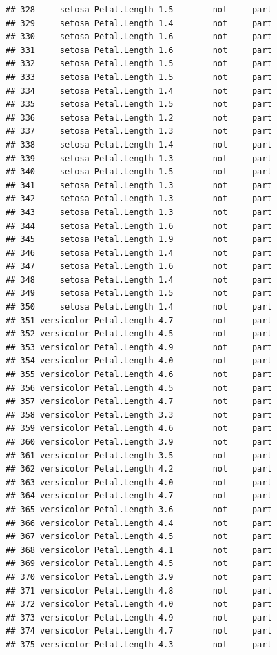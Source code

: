 \documentclass[krantz2]{krantz}\usepackage{knitr}%
\begin{document}
\begin{knitrout}
\begin{kframe}
\begin{verbatim}
## 328     setosa Petal.Length 1.5        not     part
## 329     setosa Petal.Length 1.4        not     part
## 330     setosa Petal.Length 1.6        not     part
## 331     setosa Petal.Length 1.6        not     part
## 332     setosa Petal.Length 1.5        not     part
## 333     setosa Petal.Length 1.5        not     part
## 334     setosa Petal.Length 1.4        not     part
## 335     setosa Petal.Length 1.5        not     part
## 336     setosa Petal.Length 1.2        not     part
## 337     setosa Petal.Length 1.3        not     part
## 338     setosa Petal.Length 1.4        not     part
## 339     setosa Petal.Length 1.3        not     part
## 340     setosa Petal.Length 1.5        not     part
## 341     setosa Petal.Length 1.3        not     part
## 342     setosa Petal.Length 1.3        not     part
## 343     setosa Petal.Length 1.3        not     part
## 344     setosa Petal.Length 1.6        not     part
## 345     setosa Petal.Length 1.9        not     part
## 346     setosa Petal.Length 1.4        not     part
## 347     setosa Petal.Length 1.6        not     part
## 348     setosa Petal.Length 1.4        not     part
## 349     setosa Petal.Length 1.5        not     part
## 350     setosa Petal.Length 1.4        not     part
## 351 versicolor Petal.Length 4.7        not     part
## 352 versicolor Petal.Length 4.5        not     part
## 353 versicolor Petal.Length 4.9        not     part
## 354 versicolor Petal.Length 4.0        not     part
## 355 versicolor Petal.Length 4.6        not     part
## 356 versicolor Petal.Length 4.5        not     part
## 357 versicolor Petal.Length 4.7        not     part
## 358 versicolor Petal.Length 3.3        not     part
## 359 versicolor Petal.Length 4.6        not     part
## 360 versicolor Petal.Length 3.9        not     part
## 361 versicolor Petal.Length 3.5        not     part
## 362 versicolor Petal.Length 4.2        not     part
## 363 versicolor Petal.Length 4.0        not     part
## 364 versicolor Petal.Length 4.7        not     part
## 365 versicolor Petal.Length 3.6        not     part
## 366 versicolor Petal.Length 4.4        not     part
## 367 versicolor Petal.Length 4.5        not     part
## 368 versicolor Petal.Length 4.1        not     part
## 369 versicolor Petal.Length 4.5        not     part
## 370 versicolor Petal.Length 3.9        not     part
## 371 versicolor Petal.Length 4.8        not     part
## 372 versicolor Petal.Length 4.0        not     part
## 373 versicolor Petal.Length 4.9        not     part
## 374 versicolor Petal.Length 4.7        not     part
## 375 versicolor Petal.Length 4.3        not     part

\end{verbatim}
\end{kframe}
\end{knitrout}
\end{document}
